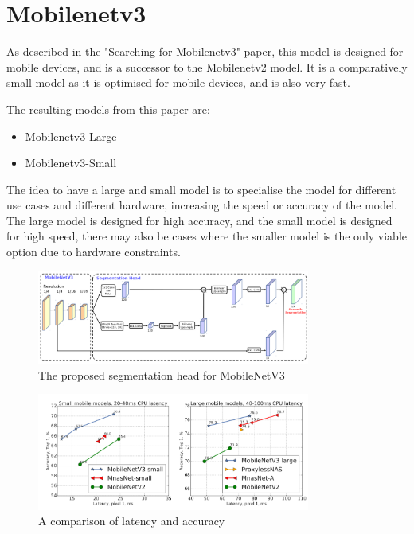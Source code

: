\documentclass[]{final_report}
\begin{document}
\section{Mobilenetv3}

As described in the "Searching for Mobilenetv3" paper\cite{DBLP:journals/corr/abs-1905-02244}, this model is designed for mobile devices, and is a successor to the Mobilenetv2 model.
It is a comparatively small model as it is optimised for mobile devices, and is also very fast.

The resulting models from this paper are:
\begin{itemize}
    \item Mobilenetv3-Large
    \item Mobilenetv3-Small
\end{itemize}

The idea to have a large and small model is to specialise the model for different use cases and different hardware, increasing the speed or accuracy of the model.
The large model is designed for high accuracy, and the small model is designed for high speed, there may also be cases where the smaller model is the only viable option due to hardware constraints.

\begin{figure}[ht!]
  \centering
  \includegraphics[width=0.8\textwidth]{images/MobileNetv3-structure.png}
  \caption{The proposed segmentation head for MobileNetV3\cite{DBLP:journals/corr/abs-1905-02244}}
  \label{fig:mobilenetv3-segmentation}
\end{figure}

\begin{figure}[ht!]
  \centering
  \includegraphics[width=0.8\textwidth]{images/mobilenet-comparison.png}
  \caption{A comparison of latency and accuracy\cite{DBLP:journals/corr/abs-1905-02244}}
  \label{fig:mobilenetv3-comparison}
\end{figure}
\end{document}
